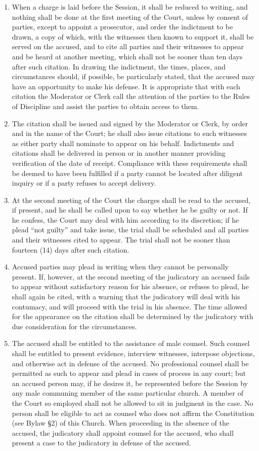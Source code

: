 \documentclass[
]{book}
\begin{document}
\begin{enumerate}
\item
  When a charge is laid before the Session, it shall be reduced to writing, and nothing shall be done at the first meeting of the Court, unless by consent of parties, except to appoint a prosecutor, and order the indictment to be drawn, a copy of which, with the witnesses then known to support it, shall be served on the accused, and to cite all parties and their witnesses to appear and be heard at another meeting, which shall not be sooner than ten days after such citation. In drawing the indictment, the times, places, and circumstances should, if possible, be particularly stated, that the accused may have an opportunity to make his defense. It is appropriate that with each citation the Moderator or Clerk call the attention of the parties to the Rules of Discipline and assist the parties to obtain access to them.
\item
  The citation shall be issued and signed by the Moderator or Clerk, by order and in the name of the Court; he shall also issue citations to such witnesses as either party shall nominate to appear on his behalf. Indictments and citations shall be delivered in person or in another manner providing verification of the date of receipt. Compliance with these requirements shall be deemed to have been fulfilled if a party cannot be located after diligent inquiry or if a party refuses to accept delivery.
\item
  At the second meeting of the Court the charges shall be read to the accused, if present, and he shall be called upon to say whether he be guilty or not. If he confess, the Court may deal with him according to its discretion; if he plead ``not guilty'' and take issue, the trial shall be scheduled and all parties and their witnesses cited to appear. The trial shall not be sooner than fourteen (14) days after such citation.
\item
  Accused parties may plead in writing when they cannot be personally present. If, however, at the second meeting of the judicatory an accused fails to appear without satisfactory reason for his absence, or refuses to plead, he shall again be cited, with a warning that the judicatory will deal with his contumacy, and will proceed with the trial in his absence. The time allowed for the appearance on the citation shall be determined by the judicatory with due consideration for the circumstances.
\item
  The accused shall be entitled to the assistance of male counsel. Such counsel shall be entitled to present evidence, interview witnesses, interpose objections, and otherwise act in defense of the accused. No professional counsel shall be permitted as such to appear and plead in cases of process in any court; but an accused person may, if he desires it, be represented before the Session by any male communing member of the same particular church. A member of the Court so employed shall not be allowed to sit in judgment in the case. No person shall be eligible to act as counsel who does not affirm the Constitution (see Bylaw §2) of this Church. When proceeding in the absence of the accused, the judicatory shall appoint counsel for the accused, who shall present a case to the judicatory in defense of the accused.

\end{enumerate}
\end{document}
